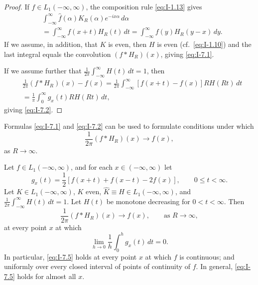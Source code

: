 \begin{proof}
If $f\in L_1(-\infty,\infty)$, the composition rule \eqref{eq:I-1.13} gives
\begin{equation}\label{eq:I-7.4}
\begin{aligned}
&\int_{-\infty}^{\infty}\hat f(\alpha)K_R(\alpha)e^{-ix\alpha}\,d\alpha\\
&= \int_{-\infty}^{\infty}f(x+t)H_R(t)\,dt = \int_{-\infty}^{\infty}f(y)H_R(y-x)\,dy.
\end{aligned}
\end{equation}
If we assume, in addition, that $K$ is even, then $H$ is even (cf.\ \eqref{eq:I-1.10}) and the last integral equals the convolution $(f*H_R)(x)$, giving \eqref{eq:I-7.1}.

If we assume further that $\frac{1}{2\pi}\int_{-\infty}^{\infty}H(t)\,dt=1$, then
\begin{equation*}
\begin{aligned}
&\frac{1}{2\pi}(f*H_R)(x)-f(x) = \frac{1}{2\pi}\int_{-\infty}^{\infty}[f(x+t)-f(x)]RH(Rt)\,dt\\
&= \frac{1}{\pi}\int_0^\infty g_x(t)RH(Rt)\,dt,
\end{aligned}
\end{equation*}
giving \eqref{eq:I-7.2}.
\end{proof}

Formulas \eqref{eq:I-7.1} and \eqref{eq:I-7.2} can be used to formulate conditions under which
\begin{equation*}
\frac{1}{2\pi}(f*H_R)(x)\to f(x),
\end{equation*}
as $R\to\infty$.

\begin{theorem}\label{thm:I-9}
Let $f\in L_1(-\infty,\infty)$, and for each $x\in(-\infty,\infty)$ let
\begin{equation*}
g_x(t)=\frac12[f(x+t)+f(x-t)-2f(x)],\qquad 0\le t<\infty.
\end{equation*}
Let $K\in L_1(-\infty,\infty)$, $K$ even, $\hat K\equiv H\in L_1(-\infty,\infty)$, and $\frac{1}{2\pi}\int_{-\infty}^{\infty}H(t)\,dt=1$. Let $H(t)$ be monotone decreasing for $0<t<\infty$. Then
\begin{equation}\label{eq:I-7.5}
\frac{1}{2\pi}(f*H_R)(x)\to f(x),\qquad\text{as }R\to\infty,
\end{equation}
at every point $x$ at which
\begin{equation}\label{eq:I-7.6}
\lim_{h\to 0}\frac{1}{h}\int_0^h g_x(t)\,dt=0.
\end{equation}
In particular, \eqref{eq:I-7.5} holds at every point $x$ at which $f$ is continuous; and uniformly over every closed interval of points of continuity of $f$. In general, \eqref{eq:I-7.5} holds for almost all $x$.
\end{theorem}

